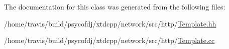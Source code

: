 The documentation for this class was generated from the following files\-:\begin{DoxyCompactItemize}
\item 
/home/travis/build/psycofdj/xtdcpp/network/src/http/\hyperlink{Template_8hh}{Template.\-hh}\item 
/home/travis/build/psycofdj/xtdcpp/network/src/http/\hyperlink{Template_8cc}{Template.\-cc}\end{DoxyCompactItemize}
